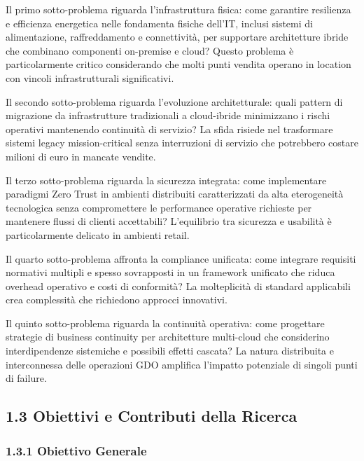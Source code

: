 \documentclass{report}
\begin{document}
Il primo sotto-problema riguarda l'infrastruttura fisica: come garantire
resilienza e efficienza energetica nelle fondamenta fisiche dell'IT,
inclusi sistemi di alimentazione, raffreddamento e connettività, per
supportare architetture ibride che combinano componenti on-premise e
cloud? Questo problema è particolarmente critico considerando che molti
punti vendita operano in location con vincoli infrastrutturali
significativi.

Il secondo sotto-problema riguarda l'evoluzione architetturale: quali
pattern di migrazione da infrastrutture tradizionali a cloud-ibride
minimizzano i rischi operativi mantenendo continuità di servizio? La
sfida risiede nel trasformare sistemi legacy mission-critical senza
interruzioni di servizio che potrebbero costare milioni di euro in
mancate vendite.

Il terzo sotto-problema riguarda la sicurezza integrata: come
implementare paradigmi Zero Trust in ambienti distribuiti caratterizzati
da alta eterogeneità tecnologica senza compromettere le performance
operative richieste per mantenere flussi di clienti accettabili?
L'equilibrio tra sicurezza e usabilità è particolarmente delicato in
ambienti retail.

Il quarto sotto-problema affronta la compliance unificata: come
integrare requisiti normativi multipli e spesso sovrapposti in un
framework unificato che riduca overhead operativo e costi di conformità?
La molteplicità di standard applicabili crea complessità che richiedono
approcci innovativi.

Il quinto sotto-problema riguarda la continuità operativa: come
progettare strategie di business continuity per architetture multi-cloud
che considerino interdipendenze sistemiche e possibili effetti cascata?
La natura distribuita e interconnessa delle operazioni GDO amplifica
l'impatto potenziale di singoli punti di failure.

\subsection{\texorpdfstring{\textbf{1.3 Obiettivi e Contributi della
Ricerca}}{1.3 Obiettivi e Contributi della Ricerca}}\label{obiettivi-e-contributi-della-ricerca}

\subsubsection{\texorpdfstring{\textbf{1.3.1 Obiettivo
Generale}}{1.3.1 Obiettivo Generale}}\label{obiettivo-generale}
\end{document}
